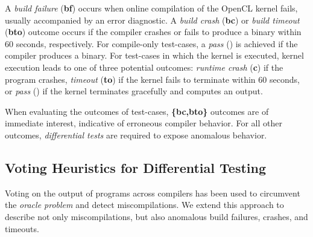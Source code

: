 A \emph{build failure} (\textbf{bf}) occurs when online compilation of the OpenCL kernel fails, usually accompanied by an error diagnostic. A \emph{build crash} (\textbf{bc}) or \emph{build timeout} (\textbf{bto}) outcome occurs if the compiler crashes or fails to produce a binary within 60 seconds, respectively. For compile-only test-cases, a \emph{pass} (\textbf{\cmark}) is achieved if the compiler produces a binary. For test-cases in which the kernel is executed, kernel execution leads to one of three potential outcomes: \emph{runtime crash} (\textbf{c}) if the program crashes, \emph{timeout} (\textbf{to}) if the kernel fails to terminate within 60 seconds, or \emph{pass} (\textbf{\cmark}) if the kernel terminates gracefully and computes an output. 
%

When evaluating the outcomes of test-cases, \textbf{\{bc,bto\}} outcomes are of immediate interest, indicative of erroneous compiler behavior. For all other outcomes, \emph{differential tests} are required to expose anomalous behavior.


\subsection{Voting Heuristics for Differential Testing}

Voting on the output of programs across compilers has been used to circumvent the \emph{oracle problem} and detect miscompilations.
We extend this approach to describe not only miscompilations, but also anomalous build failures, crashes, and timeouts.

